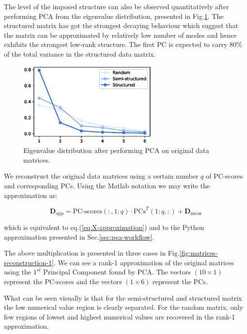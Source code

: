 \documentclass[10pt,twocolumn]{article}
\begin{document}
The level of the imposed structure can also be observed quantitatively after performing PCA from the eigenvalue distribution, presented in Fig.\ref{fig:eigenvalues}. The structured matrix has got the strongest decaying behaviour which suggest that the matrix can be approximated by relatively low number of modes and hence exhibits the strongest low-rank structure. The first PC is expected to carry 80\% of the total variance in the structured data matrix.

\begin{figure}[H]
\centering\includegraphics[width=7cm]{DWGs/matrix-reconstruction-eigenvalues-comparison.eps}
\caption{Eigenvalue distribution after performing PCA on original data matrices.}			
\label{fig:eigenvalues}
\end{figure}

We reconstruct the original data matrices using a certain number $q$ of PC-scores and corresponding PCs. Using the Matlab notation we may write the approximation as:

\begin{equation} \label{eq:data-set-approximation}
\bm{D}_{\text{app}} = \text{PC-scores}(:,1:q) \cdot \text{PCs}^T(1:q,:) + \bm{D}_{\text{mean}}
\end{equation}

which is equivalent to eq.(\ref{eq:X-approximation}) and to the Python approximation presented in Sec.\ref{sec:pca-workflow}.

The above multiplication is presented in three cases in Fig.\ref{fig:matrices-reconstruction-1}. We can see a rank-1 approximation of the original matrices using the $1^{st}$ Principal Component found by PCA. The vectors $(10 \times 1)$ represent the PC-scores and the vectors $(1 \times 6)$ represent the PCs.

What can be seen visually is that for the semi-structured and structured matrix the low numerical value region is clearly separated. For the random matrix, only few regions of lowest and highest numerical values are recovered in the rank-1 approximation.
\end{document}
